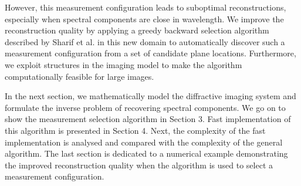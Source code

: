 \documentclass{article}
\begin{document}


However, this measurement configuration leads to suboptimal reconstructions,
especially when spectral components are close in wavelength. We improve the
reconstruction quality by applying a greedy backward selection algorithm described
by Sharif et al. \cite{sharif} in this new domain to automatically discover such a measurement
configuration from a set of candidate plane locations. Furthermore, we exploit
structures in the imaging model to make the algorithm computationally feasible
for large images.

In the next section, we mathematically model the diffractive imaging system and
formulate the inverse problem of recovering spectral components. We go on to
show the measurement selection algorithm in Section 3. Fast implementation of
this algorithm is presented in Section 4. Next, the complexity of the fast
implementation is analysed and compared with the complexity of the general algorithm. The last
section is dedicated to a numerical example demonstrating the improved
reconstruction quality when the algorithm is used to select a measurement
configuration.
\end{document}
